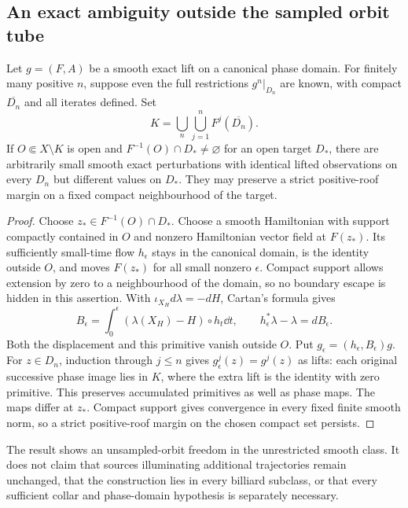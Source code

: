 \subsection{An exact ambiguity outside the sampled orbit tube}
\begin{theorem}
\label{thm:v83-unobserved}
Let $g=(F,A)$ be a smooth exact lift on a canonical phase domain.
For finitely many positive $n$, suppose even the full restrictions
$g^n|_{D_n}$ are known, with compact $\overline{D_n}$ and all iterates
defined. Set
\[
 K=\bigcup_n\bigcup_{j=1}^n F^j(\overline{D_n}).
\]
If $O\Subset X\setminus K$ is open and
$F^{-1}(O)\cap D_*\ne\varnothing$ for an open target $D_*$,
there are arbitrarily small smooth exact perturbations with identical
lifted observations on every $D_n$ but different values on $D_*$.
They may preserve a strict positive-roof margin on a fixed compact
neighbourhood of the target.
\end{theorem}
\begin{proof}
Choose $z_*\in F^{-1}(O)\cap D_*$. Choose a smooth Hamiltonian
with support compactly contained in $O$ and nonzero Hamiltonian vector
field at $F(z_*)$. Its sufficiently small-time flow $h_\epsilon$
stays in the canonical domain, is the identity outside $O$, and moves
$F(z_*)$ for all small nonzero $\epsilon$. Compact support allows
extension by zero to a neighbourhood of the domain, so no boundary
escape is hidden in this assertion. With
$\iota_{X_H}d\lambda=-dH$, Cartan's formula gives
\[
 B_\epsilon=\int_0^\epsilon
 (\lambda(X_H)-H)\circ h_t\dd t,
 \qquad h_\epsilon^*\lambda-\lambda=dB_\epsilon.
\]
Both the displacement and this primitive vanish outside $O$.
Put $g_\epsilon=(h_\epsilon,B_\epsilon)g$. For $z\in D_n$,
induction through $j\le n$ gives $g_\epsilon^j(z)=g^j(z)$ as lifts:
each original successive phase image lies in $K$, where the extra
lift is the identity with zero primitive. This preserves accumulated
primitives as well as phase maps. The maps differ at $z_*$. Compact
support gives convergence in every fixed finite smooth norm, so a
strict positive-roof margin on the chosen compact set persists.
\end{proof}
The result shows an unsampled-orbit freedom in the unrestricted smooth
class. It does not claim that sources illuminating additional
trajectories remain unchanged, that the construction lies in every
billiard subclass, or that every sufficient collar and phase-domain
hypothesis is separately necessary.

